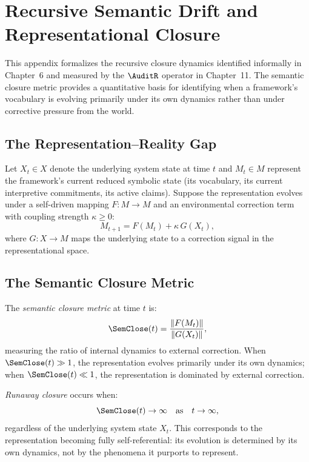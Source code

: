 
\chapter{Recursive Semantic Drift and Representational Closure}
\label{app:closure}

\noindent
This appendix formalizes the recursive closure dynamics
identified informally in Chapter~6 and measured by
the $\AuditR$ operator in Chapter~11. The semantic
closure metric provides a quantitative basis for
identifying when a framework's vocabulary is evolving
primarily under its own dynamics rather than under
corrective pressure from the world.

\section{The Representation--Reality Gap}
\label{app-f:gap}

Let $X_t \in X$ denote the underlying system state
at time $t$ and $M_t \in M$ represent the framework's
current reduced symbolic state (its vocabulary, its
current interpretive commitments, its active claims).
Suppose the representation evolves under a self-driven
mapping $F : M \to M$ and an environmental correction
term with coupling strength $\kappa \ge 0$:
\[
  M_{t+1} = F(M_t) + \kappa\,G(X_t),
\]
where $G : X \to M$ maps the underlying state to a
correction signal in the representational space.

\section{The Semantic Closure Metric}
\label{app-f:closure-metric}

\begin{definition}
The \emph{semantic closure metric} at time $t$ is:
\[
  \SemClose(t) = \frac{\|F(M_t)\|}{\|G(X_t)\|},
\]
measuring the ratio of internal dynamics to external
correction. When $\SemClose(t) \gg 1$, the representation
evolves primarily under its own dynamics; when
$\SemClose(t) \ll 1$, the representation is dominated
by external correction.
\end{definition}

\begin{definition}
\emph{Runaway closure} occurs when:
\[
  \SemClose(t) \to \infty \quad \text{as} \quad t \to \infty,
\]
regardless of the underlying system state $X_t$. This
corresponds to the representation becoming fully self-referential:
its evolution is determined by its own dynamics, not
by the phenomena it purports to represent.
\end{definition}

